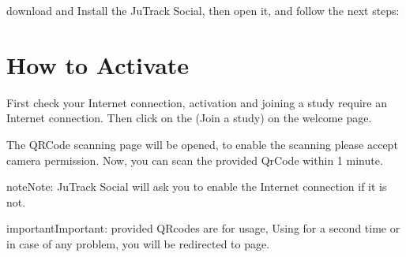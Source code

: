 \documentclass[letterpaper,10pt,english]{sphinxmanual}
\begin{document}
download and Install the JuTrack Social, then open it, and follow the next steps:

\begin{DUlineblock}{0em}
\item[] 
\end{DUlineblock}


\section{How to Activate}
\label{\detokenize{JuTrack_Social:how-to-activate}}
First check your Internet connection, activation and joining a study require an Internet connection.
Then click on the  (Join a study) on the welcome page.


\begin{DUlineblock}{0em}
\item[] 
\end{DUlineblock}

The QR\sphinxhyphen{}Code scanning page will be opened, to enable the scanning please accept camera permission.
Now, you can scan the provided Qr\sphinxhyphen{}Code within 1 minute.


\begin{DUlineblock}{0em}
\item[] 
\end{DUlineblock}

\begin{sphinxadmonition}{note}{Note:}
JuTrack Social will ask you to enable the Internet connection if it is not.
\end{sphinxadmonition}

\begin{sphinxadmonition}{important}{Important:}
provided QR\sphinxhyphen{}codes are for  usage, Using for a second time or in case of any problem, you will be redirected to  page.
\end{sphinxadmonition}

\begin{DUlineblock}{0em}
\item[] 
\end{DUlineblock}
\end{document}

